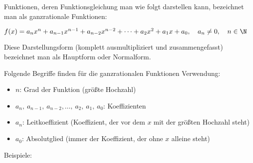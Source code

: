 Funktionen, deren Funktionsgleichung man wie folgt darstellen kann, bezeichnet man als ganzrationale Funktionen:

\(f(x)=a_nx^n+a_{n-1}x^{n-1}+a_{n-2}x^{n-2}+\dots +a_2x^2+a_1x+a_0, \quad a_n\neq 0, \quad n\in\N\)

Diese Darstellungsform (komplett ausmultipliziert und zusammengefasst) bezeichnet man als Hauptform oder Normalform.

Folgende Begriffe finden für die ganzrationalen Funktionen Verwendung:
\begin{itemize}\large
	\item[\textcolor{loes}{\textbullet}] \textcolor{loes}{\(n\): Grad der Funktion (größte Hochzahl)}
	\item[\textcolor{loes}{\textbullet}]  \textcolor{loes}{\(a_n,\ a_{n-1},\ a_{n-2}, \dots,\ a_2,\ a_1,\ a_0\): Koeffizienten}
	\item[\textcolor{loes}{\textbullet}]  \textcolor{loes}{\(a_n\): Leitkoeffizient (Koeffizient, der vor dem \(x\) mit der größten Hochzahl steht)}
	\item[\textcolor{loes}{\textbullet}]  \textcolor{loes}{\(a_0\): Absolutglied (immer der Koeffizient, der ohne \(x\) alleine steht)}
\end{itemize}\vspace{2cm}
Beispiele:

\medskip

